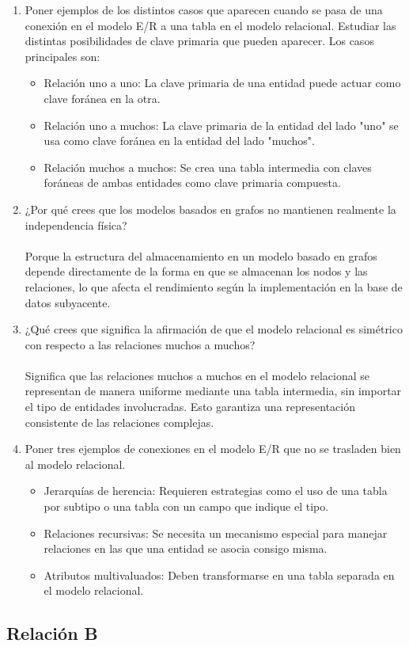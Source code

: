 \begin{enumerate}[label=\textbf{\arabic*.}, itemsep=0.5em]
    \item Poner ejemplos de los distintos casos que aparecen cuando se pasa de una conexión en el modelo E/R a una tabla en el modelo relacional. Estudiar las distintas posibilidades de clave primaria que pueden aparecer.  
    Los casos principales son:
    \begin{itemize}
        \item Relación uno a uno: La clave primaria de una entidad puede actuar como clave foránea en la otra.
        \item Relación uno a muchos: La clave primaria de la entidad del lado "uno" se usa como clave foránea en la entidad del lado "muchos".
        \item Relación muchos a muchos: Se crea una tabla intermedia con claves foráneas de ambas entidades como clave primaria compuesta.
    \end{itemize}

    \item ¿Por qué crees que los modelos basados en grafos no mantienen realmente la independencia física?  \\\\
    Porque la estructura del almacenamiento en un modelo basado en grafos depende directamente de la forma en que se almacenan los nodos y las relaciones, lo que afecta el rendimiento según la implementación en la base de datos subyacente.

    \item ¿Qué crees que significa la afirmación de que el modelo relacional es simétrico con respecto a las relaciones muchos a muchos?  \\\\
    Significa que las relaciones muchos a muchos en el modelo relacional se representan de manera uniforme mediante una tabla intermedia, sin importar el tipo de entidades involucradas. Esto garantiza una representación consistente de las relaciones complejas.

    \item Poner tres ejemplos de conexiones en el modelo E/R que no se trasladen bien al modelo relacional.  
    \begin{itemize}
        \item Jerarquías de herencia: Requieren estrategias como el uso de una tabla por subtipo o una tabla con un campo que indique el tipo.
        \item Relaciones recursivas: Se necesita un mecanismo especial para manejar relaciones en las que una entidad se asocia consigo misma.
        \item Atributos multivaluados: Deben transformarse en una tabla separada en el modelo relacional.
    \end{itemize}

\end{enumerate}

\subsection{Relación B}

